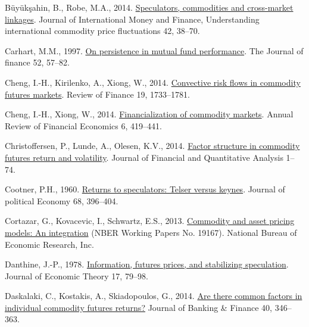\documentclass[]{elsarticle} %
\newlength{\cslhangindent}
\newlength{\cslentryspacingunit} %
\newenvironment{CSLReferences}[2] %
 {%
  \setlength{\parindent}{0pt}
  \ifodd #1
  \let\oldpar\par
  \def\par{\hangindent=\cslhangindent\oldpar}
  \fi
  \setlength{\parskip}{#2\cslentryspacingunit}
 }%
 {}
\begin{document}
\begin{CSLReferences}{1}{0}
\leavevmode{}%
Büyükşahin, B., Robe, M.A., 2014. \href{https://doi.org/10.1016/j.jimonfin.2013.08.004}{Speculators, commodities and cross-market linkages}. Journal of International Money and Finance, Understanding international commodity price fluctuations 42, 38--70.

\leavevmode{}%
Carhart, M.M., 1997. \href{https://doi.org/10.2307/2329556}{On persistence in mutual fund performance}. The Journal of finance 52, 57--82.

\leavevmode{}%
Cheng, I.-H., Kirilenko, A., Xiong, W., 2014. \href{https://doi.org/10.1093/rof/rfu043}{Convective risk flows in commodity futures markets}. Review of Finance 19, 1733--1781.

\leavevmode{}%
Cheng, I.-H., Xiong, W., 2014. \href{https://doi.org/10.1146/annurev-financial-110613-034432}{Financialization of commodity markets}. Annual Review of Financial Economics 6, 419--441.

\leavevmode{}%
Christoffersen, P., Lunde, A., Olesen, K.V., 2014. \href{https://doi.org/10.1017/s0022109018000765}{Factor structure in commodity futures return and volatility}. Journal of Financial and Quantitative Analysis 1--74.

\leavevmode{}%
Cootner, P.H., 1960. \href{https://doi.org/10.1086/258347}{Returns to speculators: Telser versus keynes}. Journal of political Economy 68, 396--404.

\leavevmode{}%
Cortazar, G., Kovacevic, I., Schwartz, E.S., 2013. \href{https://ssrn.com/abstract=2287027}{Commodity and asset pricing models: An integration} (NBER Working Papers No. 19167). National Bureau of Economic Research, Inc.

\leavevmode{}%
Danthine, J.-P., 1978. \href{https://doi.org/10.1016/0022-0531(78)90124-2}{Information, futures prices, and stabilizing speculation}. Journal of Economic Theory 17, 79--98.

\leavevmode{}%
Daskalaki, C., Kostakis, A., Skiadopoulos, G., 2014. \href{https://doi.org/10.1016/j.jbankfin.2013.11.034}{Are there common factors in individual commodity futures returns?} Journal of Banking {\&} Finance 40, 346--363.


\end{CSLReferences}
\end{document}
